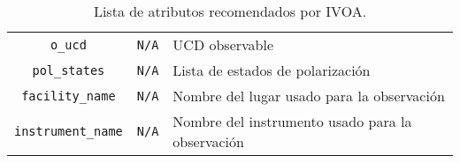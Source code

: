 \begin{table}[ht!]
\begin{tabular}{c|c|p{3in}}
		\verb;o_ucd;            & \verb;N/A;           & UCD observable \\
		\verb;pol_states;       & \verb;N/A;           & Lista de estados de polarización \\
		\verb;facility_name;    & \verb;N/A;           & Nombre del lugar usado para la observación \\
		\verb;instrument_name;  & \verb;N/A;           & Nombre del instrumento usado para la observación \\
	\end{tabular}
	\caption{Lista de atributos recomendados por IVOA.}
	\label{tab:mdIVOA}
\end{table}

